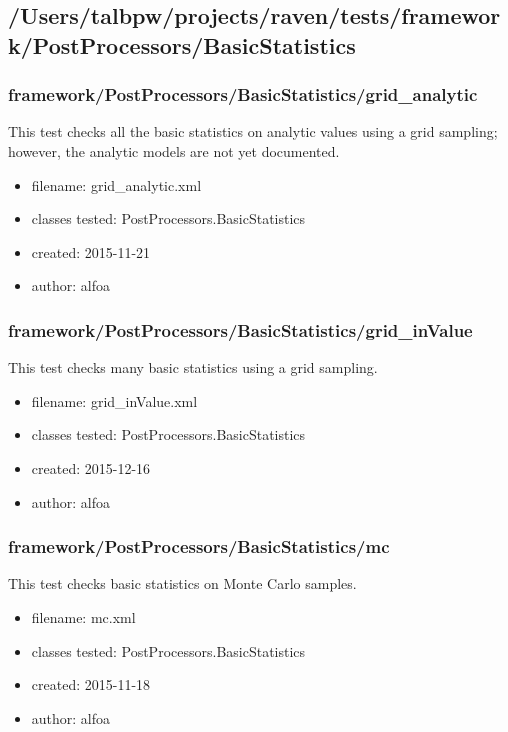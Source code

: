   \subsection{/Users/talbpw/projects/raven/tests/framework/PostProcessors/BasicStatistics}
    \subsubsection{framework/PostProcessors/BasicStatistics/grid\_analytic}
      
      This test checks all the basic statistics on analytic values using a grid sampling; however, the analytic models are not
      yet documented.
    
      \begin{itemize}
          \item filename: grid\_analytic.xml
          \item classes tested: PostProcessors.BasicStatistics
          \item created: 2015-11-21
          \item author: alfoa
      \end{itemize}
    \subsubsection{framework/PostProcessors/BasicStatistics/grid\_inValue}
      
      This test checks many basic statistics using a grid sampling.
    
      \begin{itemize}
          \item filename: grid\_inValue.xml
          \item classes tested: PostProcessors.BasicStatistics
          \item created: 2015-12-16
          \item author: alfoa
      \end{itemize}
    \subsubsection{framework/PostProcessors/BasicStatistics/mc}
      
      This test checks basic statistics on Monte Carlo samples.
    
      \begin{itemize}
          \item filename: mc.xml
          \item classes tested: PostProcessors.BasicStatistics
          \item created: 2015-11-18
          \item author: alfoa
      \end{itemize}
